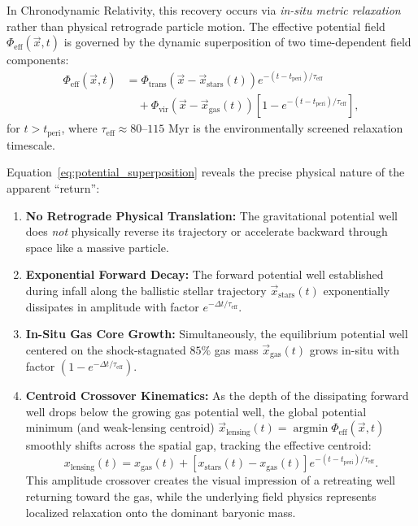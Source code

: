 \documentclass[aps,prd,reprint,superscriptaddress,nofootinbib,floatfix,amsmath,amssymb]{revtex4-2}
\begin{document}
In Chronodynamic Relativity, this recovery occurs via \textit{in-situ metric relaxation} rather than physical retrograde particle motion. The effective potential field $\Phi_{\text{eff}}(\vec{x}, t)$ is governed by the dynamic superposition of two time-dependent field components:
\begin{align}
\Phi_{\text{eff}}(\vec{x}, t) &= \Phi_{\text{trans}}(\vec{x} - \vec{x}_{\text{stars}}(t)) e^{-(t - t_{\text{peri}})/\tau_{\text{eff}}} \nonumber \\
&\quad + \Phi_{\text{vir}}(\vec{x} - \vec{x}_{\text{gas}}(t)) \left[ 1 - e^{-(t - t_{\text{peri}})/\tau_{\text{eff}}} \right],
\label{eq:potential_superposition}
\end{align}
for $t > t_{\text{peri}}$, where $\tau_{\text{eff}} \approx 80\text{--}115\text{ Myr}$ is the environmentally screened relaxation timescale. 

Equation~\eqref{eq:potential_superposition} reveals the precise physical nature of the apparent ``return'':
\begin{enumerate}
    \item \textbf{No Retrograde Physical Translation:} The gravitational potential well does \textit{not} physically reverse its trajectory or accelerate backward through space like a massive particle.
    \item \textbf{Exponential Forward Decay:} The forward potential well established during infall along the ballistic stellar trajectory $\vec{x}_{\text{stars}}(t)$ exponentially dissipates in amplitude with factor $e^{-\Delta t / \tau_{\text{eff}}}$.
    \item \textbf{In-Situ Gas Core Growth:} Simultaneously, the equilibrium potential well centered on the shock-stagnated $85\%$ gas mass $\vec{x}_{\text{gas}}(t)$ grows in-situ with factor $(1 - e^{-\Delta t / \tau_{\text{eff}}})$.
    \item \textbf{Centroid Crossover Kinematics:} As the depth of the dissipating forward well drops below the growing gas potential well, the global potential minimum (and weak-lensing centroid) $\vec{x}_{\text{lensing}}(t) = \operatorname{argmin} \Phi_{\text{eff}}(\vec{x}, t)$ smoothly shifts across the spatial gap, tracking the effective centroid:
    \begin{equation}
    x_{\text{lensing}}(t) = x_{\text{gas}}(t) + \left[ x_{\text{stars}}(t) - x_{\text{gas}}(t) \right] e^{-(t - t_{\text{peri}})/\tau_{\text{eff}}}.
    \label{eq:lagrangian_relaxation}
    \end{equation}
    This amplitude crossover creates the visual impression of a retreating well returning toward the gas, while the underlying field physics represents localized relaxation onto the dominant baryonic mass.
\end{enumerate}
\end{document}
